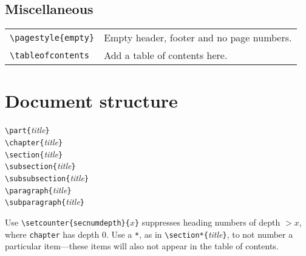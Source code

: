 \subsection{Miscellaneous}
\begin{tabular}{@{}p{\the\MyLen}%
                @{}p{\linewidth-\the\MyLen}@{}}
\verb!\pagestyle{empty}!     &   Empty header, footer
                                 and no page numbers. \\
\verb!\tableofcontents!      &   Add a table of contents here. \\

\end{tabular}



\section{Document structure}
\begin{multicols}{2}
\verb!\part{!\textit{title}\verb!}!  \\
\verb!\chapter{!\textit{title}\verb!}!  \\
\verb!\section{!\textit{title}\verb!}!  \\
\verb!\subsection{!\textit{title}\verb!}!  \\
\verb!\subsubsection{!\textit{title}\verb!}!  \\
\verb!\paragraph{!\textit{title}\verb!}!  \\
\verb!\subparagraph{!\textit{title}\verb!}!
\end{multicols}
{\raggedright
Use \verb!\setcounter{secnumdepth}{!$x$\verb!}! suppresses heading
numbers of depth $>x$, where \verb!chapter! has depth 0.
Use a \texttt{*}, as in \verb!\section*{!\textit{title}\verb!}!,
to not number a particular item---these items will also not appear
in the table of contents.
}

